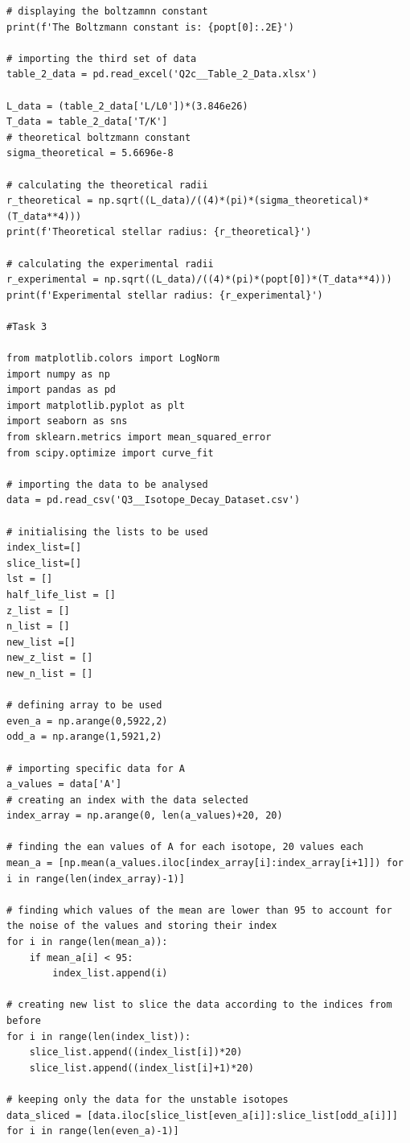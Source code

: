 \documentclass[12pt, a4paper]{article}
\begin{document}
\begin{verbatim}
# displaying the boltzamnn constant
print(f'The Boltzmann constant is: {popt[0]:.2E}')

# importing the third set of data
table_2_data = pd.read_excel('Q2c__Table_2_Data.xlsx')

L_data = (table_2_data['L/L0'])*(3.846e26)    
T_data = table_2_data['T/K']
# theoretical boltzmann constant
sigma_theoretical = 5.6696e-8                               

# calculating the theoretical radii
r_theoretical = np.sqrt((L_data)/((4)*(pi)*(sigma_theoretical)*(T_data**4)))
print(f'Theoretical stellar radius: {r_theoretical}')

# calculating the experimental radii
r_experimental = np.sqrt((L_data)/((4)*(pi)*(popt[0])*(T_data**4)))
print(f'Experimental stellar radius: {r_experimental}')

#Task 3

from matplotlib.colors import LogNorm
import numpy as np
import pandas as pd
import matplotlib.pyplot as plt
import seaborn as sns
from sklearn.metrics import mean_squared_error
from scipy.optimize import curve_fit

# importing the data to be analysed
data = pd.read_csv('Q3__Isotope_Decay_Dataset.csv')

# initialising the lists to be used
index_list=[]
slice_list=[]
lst = []
half_life_list = []
z_list = []
n_list = []
new_list =[]
new_z_list = []
new_n_list = []

# defining array to be used
even_a = np.arange(0,5922,2)
odd_a = np.arange(1,5921,2)

# importing specific data for A
a_values = data['A']
# creating an index with the data selected
index_array = np.arange(0, len(a_values)+20, 20)

# finding the ean values of A for each isotope, 20 values each
mean_a = [np.mean(a_values.iloc[index_array[i]:index_array[i+1]]) for i in range(len(index_array)-1)]

# finding which values of the mean are lower than 95 to account for the noise of the values and storing their index
for i in range(len(mean_a)):
    if mean_a[i] < 95:
        index_list.append(i)

# creating new list to slice the data according to the indices from before
for i in range(len(index_list)):
    slice_list.append((index_list[i])*20)
    slice_list.append((index_list[i]+1)*20)

# keeping only the data for the unstable isotopes
data_sliced = [data.iloc[slice_list[even_a[i]]:slice_list[odd_a[i]]] for i in range(len(even_a)-1)]


\end{verbatim}
\end{document}

